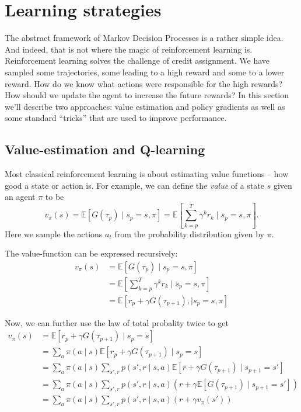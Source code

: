 \documentclass{article}
\theoremstyle{changedot}
\theoremstyle{changedotbreak}
\theoremstyle{nonumberplain}
\newcommand{\m}{\mathbb}
\begin{document}
\section{Learning strategies}
The abstract framework of Markov Decision Processes is a rather simple idea. And indeed, that is not where the magic of reinforcement learning is. Reinforcement learning solves the challenge of credit assignment. We have sampled some trajectories, some leading to a high reward and some to a lower reward. How do we know what actions were responsible for the high rewards? How should we update the agent to increase the future rewards? In this section we'll describe two approaches: value estimation and policy gradients as well as some standard ``tricks'' that are used to improve performance.

\subsection{Value-estimation and Q-learning}
Most classical reinforcement learning is about estimating value functions -- how good a state or action is. For example, we can define the \emph{value} of a state $s$ given an agent $\pi$ to be \[v_{\pi}(s) = \mathbb E \left[ G(\tau_{p}) \mid s_{p} = s, \pi \right] = \m E \left[ \sum_{k=p}^{T} \gamma^{k} r_{k} \mid s_{p} = s, \pi \right].\] Here we sample the actions $a_{t}$ from the probability distribution given by $\pi$.

The value-function can be expressed recursively:
\begin{align}
  v_{\pi}(s) &= \m E[G(\tau_{p}) \mid s_{p} = s, \pi] \\
             &= \m E\left[ \sum_{k=p}^{T} \gamma^{k} r_{k} \mid s_{p} = s, \pi \right] \\
  &= \m E \left[ r_{p} + \gamma G(\tau_{p+1}), \mid s_{p} = s, \pi \right]
\end{align}

Now, we can further use the law of total probality twice to get
\begin{align}
  v_{\pi}(s) &= \m E[r_{p} + \gamma G(\tau_{p+1}) \mid s_{p} = s] \\
             &= \sum_{a} \pi(a \mid s) \m E[r_{p} + \gamma G(\tau_{p+1}) \mid s_{p} = s] \\
             &= \sum_{a} \pi(a \mid s) \sum_{s', r} p(s', r \mid s, a) \m E[r + \gamma G(\tau_{p+1}) \mid s_{p+1} = s'] \\
             &= \sum_{a} \pi(a \mid s) \sum_{s', r} p(s', r \mid s, a) ( r + \gamma \m E[G(\tau_{p+1}) \mid s_{p+1} = s'] )\\
             &= \sum_{a} \pi(a \mid s) \sum_{s', r} p(s', r \mid s, a) (r + \gamma v_{\pi}(s'))
\end{align}
\end{document}

